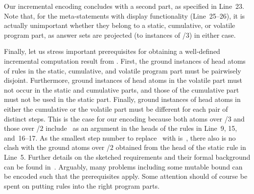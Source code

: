 Our incremental encoding concludes with a second  part,
as specified in Line~23.
Note that, for the meta-statements with display functionality (Line~25--26),
it is actually unimportant whether they belong to a static, cumulative, or
volatile program part, as answer sets are projected
(to instances of /$3$) in either case.
%

Finally, let us stress important prerequisites for obtaining
a well-defined incremental computation result from \clingo.
First, the ground instances of head atoms of rules in the
static, cumulative, and volatile program part must be pairwisely disjoint.
Furthermore, ground instances of head atoms in the volatile part
must not occur in the static and cumulative parts,
and those of the cumulative part must not be used in the static part.
Finally, ground instances of head atoms in either the cumulative or the volatile part
must be different for each pair of distinct steps.
This is the case for our encoding because both atoms over /$3$
and those over \pred{holds}/$2$ include~\const{t} as an argument in the
heads of the rules in Line~9, 15, and~16--17.
As the smallest step number to replace~ with is~,
there also is no clash with the ground atoms over \pred{holds}/$2$
obtained from the head of the static rule in Line~5.
Further details on the sketched requirements and their formal background can
be found in~\cite{gekakaosscth08a}.
Arguably, many problems including some mutable bound can be encoded
such that the prerequisites apply.
Some attention should of course be spent on
putting rules into the right program parts.


